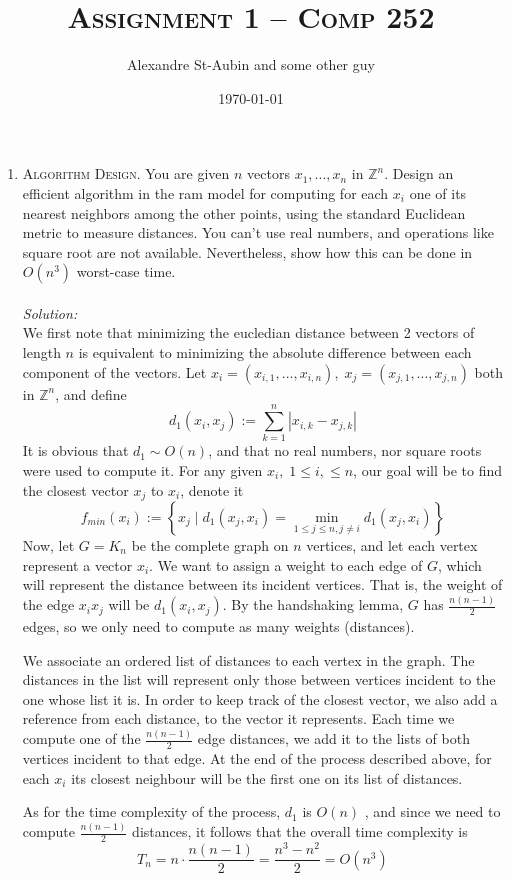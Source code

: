 \documentclass[12pt]{article}
\title{\textsc{Assignment 1 -- Comp 252}}
\author{Alexandre St-Aubin and some other guy}
\date{\today}
\theoremstyle{definition}
\theoremstyle{remark}
\newcommand\sol{%
  \\ 
  \\
  \textit{Solution:}\\%
}
\begin{document}
\maketitle 
\begin{enumerate}
  \item \textsc{Algorithm Design.}
You are given $n$ vectors $x_1,... , x_n$ in $\mathbb{Z}^n$. Design an efficient algorithm in the ram model for computing for each $x_i$ one of its nearest
neighbors among the other points, using the standard Euclidean metric to measure distances. You can’t
use real numbers, and operations like square root are not available. Nevertheless, show how this can be
done in $O(n^3)$ worst-case time.
\sol   
   We first note that minimizing the eucledian distance between 2 vectors of length $n$ is equivalent to minimizing the absolute difference between each component of the vectors. Let $x_i = (x_{i,1}, ..., x_{i,n}), \; x_j = (x_{j,1}, ..., x_{j,n})$ both in $\mathbb{Z}^n$, and define 
  $$d_1(x_i, x_j) := \sum_{k=1}^n |x_{i,k} -x_{j,k}| $$
  It is obvious that $d_1 \sim O(n)$, and that no real numbers, nor square roots were used to compute it. For any given $x_i, \; 1\leq i, \leq n$, our goal will be to find the closest vector $x_j$ to $x_i$, denote it
  $$ f_{min}(x_i) := \left\{x_j \mid d_1(x_j, x_i) = \min_{1\leq j\leq n,j\neq i} d_1(x_j, x_i)  \right\} $$
  \hspace{24pt} Now, let $G=K_n$ be the complete graph on $n$ vertices, and let each vertex represent a vector $x_i.$ We want to assign a weight to each edge of $G$, which will represent the distance between its incident vertices. That is, the weight of the edge $x_ix_j$ will be $d_1 (x_i, x_j).$ By the handshaking lemma, $G$ has $\frac{n(n-1)}{2} $ edges, so we only need to compute as many weights (distances).  


   \hspace{24pt} We associate an ordered list of distances to each vertex in the graph. The distances in the list will represent only those between vertices incident to the one whose list it is. In order to keep track of the closest vector, we also add a reference from each distance, to the vector it represents. Each time we compute one of the $\frac{n(n-1)}{2}$ edge distances, we add it to the lists of both vertices incident to that edge. At the end of the process described above, for each $x_i$ its closest neighbour will be the first one on its list of distances.
   
   \hspace{24pt} As for the time complexity of the process, $d_1$ is $O(n)$ , and since we need to compute $\frac{n(n-1)}{2}$ distances, it follows that the overall time complexity is
   $$T_n = n \cdot \frac{n(n-1)}{2} = \frac{n^3-n^2}{2} = O(n^3) $$
\end{enumerate}
 
\end{document}
